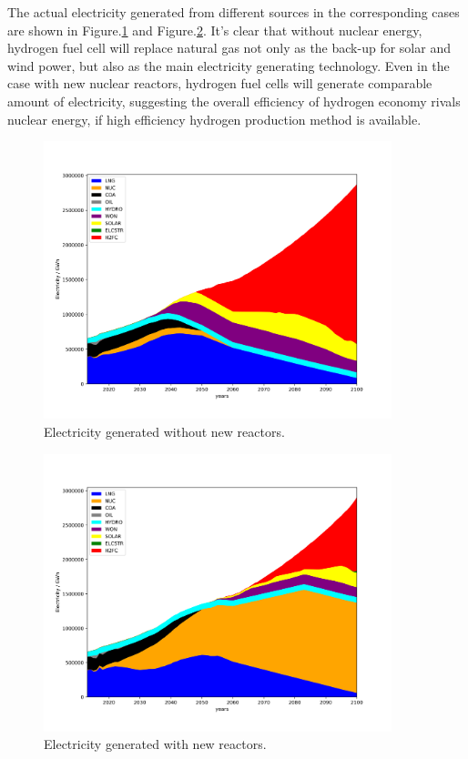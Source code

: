 \documentclass[14pt,a4paper]{article} %
\begin{document}
The actual electricity generated from different sources in the corresponding cases are shown in Figure.\ref{fig:nonucpower} and Figure.\ref{fig:nucpower}. It's clear that without nuclear energy, hydrogen fuel cell will replace natural gas not only as the back-up for solar and wind power, but also as the main electricity generating technology. Even in the case with new nuclear reactors, hydrogen fuel cells will generate comparable amount of electricity, suggesting the overall efficiency of hydrogen economy rivals nuclear energy, if high efficiency hydrogen production method is available.
\begin{figure}[H]
  \centering
    \includegraphics[width=0.9\textwidth]{./plot/nonuc_power.png}
  \caption{Electricity generated without new reactors.}
  \label{fig:nonucpower}
\end{figure}
\begin{figure}[H]
  \centering
    \includegraphics[width=0.9\textwidth]{./plot/nuc_power.png}
  \caption{Electricity generated with new reactors.}
  \label{fig:nucpower}
\end{figure}
\end{document}
